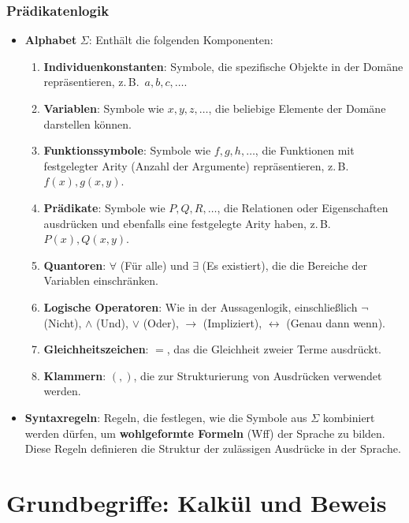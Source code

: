 \documentclass{book}
\theoremstyle{plain}
\theoremstyle{remark}
\theoremstyle{definition}
\begin{document}
\subsubsection{Prädikatenlogik}

\begin{itemize}
    \item \textbf{Alphabet} \( \Sigma \): Enthält die folgenden Komponenten:
    \begin{enumerate}
        \item \textbf{Individuenkonstanten}: Symbole, die spezifische Objekte in der Domäne repräsentieren, z.\,B.\ \( a, b, c, \ldots \).
        \item \textbf{Variablen}: Symbole wie \( x, y, z, \ldots \), die beliebige Elemente der Domäne darstellen können.
        \item \textbf{Funktionssymbole}: Symbole wie \( f, g, h, \ldots \), die Funktionen mit festgelegter Arity (Anzahl der Argumente) repräsentieren, z.\,B.\ \( f(x), g(x, y) \).
        \item \textbf{Prädikate}: Symbole wie \( P, Q, R, \ldots \), die Relationen oder Eigenschaften ausdrücken und ebenfalls eine festgelegte Arity haben, z.\,B.\ \( P(x), Q(x, y) \).
        \item \textbf{Quantoren}: \( \forall \) (Für alle) und \( \exists \) (Es existiert), die die Bereiche der Variablen einschränken.
        \item \textbf{Logische Operatoren}: Wie in der Aussagenlogik, einschließlich \( \neg \) (Nicht), \( \land \) (Und), \( \lor \) (Oder), \( \rightarrow \) (Impliziert), \( \leftrightarrow \) (Genau dann wenn).
        \item \textbf{Gleichheitszeichen}: \( = \), das die Gleichheit zweier Terme ausdrückt.
        \item \textbf{Klammern}: \( (, ) \), die zur Strukturierung von Ausdrücken verwendet werden.
    \end{enumerate}
    
    \item \textbf{Syntaxregeln}: Regeln, die festlegen, wie die Symbole aus \( \Sigma \) kombiniert werden dürfen, um \textbf{wohlgeformte Formeln} (Wff) der Sprache zu bilden. Diese Regeln definieren die Struktur der zulässigen Ausdrücke in der Sprache.
\end{itemize}

\section{Grundbegriffe: Kalkül und Beweis}
\end{document}
